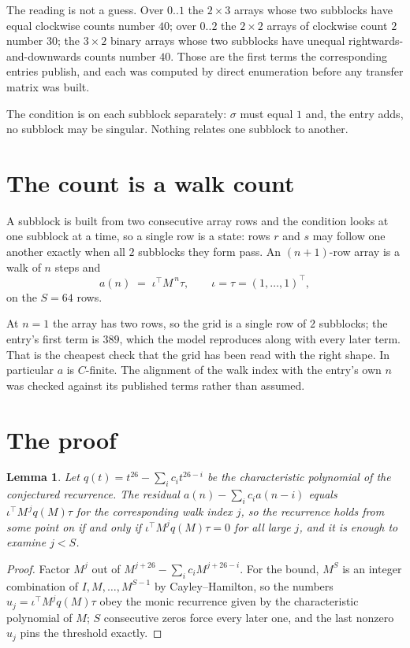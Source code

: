 \documentclass[11pt,a4paper]{article}
\theoremstyle{plain}
\newtheorem{lemma}[theorem]{Lemma}
\theoremstyle{definition}
\begin{document}
The reading is not a guess. Over $0..1$ the $2\times3$ arrays whose two subblocks have equal
clockwise counts number $40$; over $0..2$ the $2\times2$ arrays of clockwise count $2$ number
$30$; the $3\times2$ binary arrays whose two subblocks have unequal rightwards-and-downwards
counts number $40$. Those are the first terms the corresponding entries publish, and each was
computed by direct enumeration before any transfer matrix was built.

The condition is on each subblock separately: $\sigma$ must equal $1$ and, the entry adds, no subblock may be singular. Nothing
relates one subblock to another.

\section{The count is a walk count}

A subblock is built from two consecutive array rows and the condition looks
at one subblock at a time, so a single row is a state: rows $r$ and $s$ may follow one another
exactly when all $2$ subblocks they form pass. An $(n+1)$-row array is a walk of $n$ steps and
\[
a(n)\;=\;\iota^{\!\top}M^{\,n}\tau,\qquad\iota=\tau=(1,\dots,1)^{\!\top},
\]
on the $S=64$ rows.

At $n=1$ the array has two rows, so the grid is a single row of $2$
subblocks; the entry's first term is $389$, which the model
reproduces along with every later term. That is the cheapest check that the grid has been read
with the right shape.
In particular $a$ is $C$-finite. The alignment of the walk index with the entry's own $n$ was
checked against its published terms rather than assumed.

\section{The proof}

\begin{lemma}\label{lem:crit}
Let $q(t)=t^{26}-\sum_i c_it^{26-i}$ be the characteristic polynomial of the
conjectured recurrence. The residual $a(n)-\sum_ic_ia(n-i)$ equals
$\iota^{\!\top}M^{\,j}q(M)\tau$ for the corresponding walk index $j$, so the recurrence
holds from some point on if and only if $\iota^{\!\top}M^{j}q(M)\tau=0$ for all large $j$,
and it is enough to examine $j<S$.
\end{lemma}

\begin{proof}
Factor $M^{j}$ out of $M^{j+26}-\sum_ic_iM^{j+26-i}$. For the bound, $M^{S}$
is an integer combination of $I,M,\dots,M^{S-1}$ by Cayley--Hamilton, so the numbers
$u_j=\iota^{\!\top}M^{j}q(M)\tau$ obey the monic recurrence given by the characteristic
polynomial of $M$; $S$ consecutive zeros force every later one, and the last nonzero $u_j$
pins the threshold exactly.
\end{proof}
\end{document}
